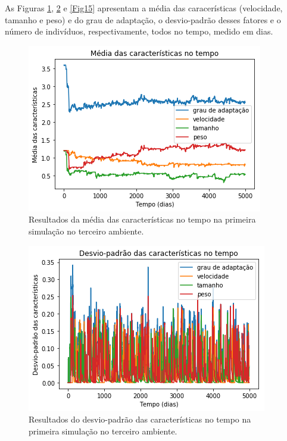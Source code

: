 \documentclass[10pt,brazil,english]{article}
\begin{document}
            As Figuras \ref{Fig13}, \ref{Fig14} e \ref{Fig15} apresentam a média das caracerísticas (velocidade, tamanho e peso) e do grau de adaptação, o desvio-padrão desses fatores e o número de indivíduos, respectivamente, todos no tempo, medido em dias.
            
            \begin{figure}[!hbtp]
                \begin{center}
                    \includegraphics[scale=0.5]{Images/3-1.png}
                \end{center}
                \caption{Resultados da média das características no tempo na primeira simulação no terceiro ambiente.}
                \label{Fig13}
            \end{figure} 
            
            \begin{figure}[!hbtp]
                \begin{center}
                    \includegraphics[scale=0.5]{Images/3-2.png}
                \end{center}
                \caption{Resultados do desvio-padrão das características no tempo na primeira simulação no terceiro ambiente.}
                \label{Fig14}
            \end{figure} 
            
\end{document}
